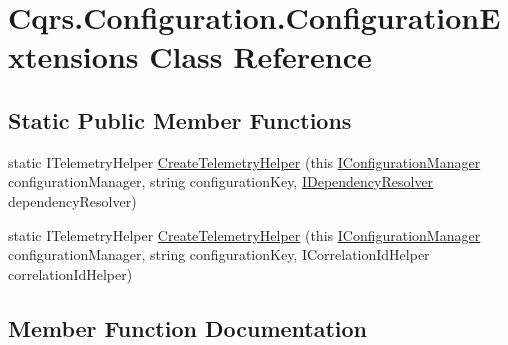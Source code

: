 \hypertarget{classCqrs_1_1Configuration_1_1ConfigurationExtensions}{}\section{Cqrs.\+Configuration.\+Configuration\+Extensions Class Reference}
\label{classCqrs_1_1Configuration_1_1ConfigurationExtensions}
\subsection*{Static Public Member Functions}
\begin{DoxyCompactItemize}
\item 
static I\+Telemetry\+Helper \hyperlink{classCqrs_1_1Configuration_1_1ConfigurationExtensions_aea6ef58f3c312c44a96985c033e7a9ae_aea6ef58f3c312c44a96985c033e7a9ae}{Create\+Telemetry\+Helper} (this \hyperlink{interfaceCqrs_1_1Configuration_1_1IConfigurationManager}{I\+Configuration\+Manager} configuration\+Manager, string configuration\+Key, \hyperlink{interfaceCqrs_1_1Configuration_1_1IDependencyResolver}{I\+Dependency\+Resolver} dependency\+Resolver)
\item 
static I\+Telemetry\+Helper \hyperlink{classCqrs_1_1Configuration_1_1ConfigurationExtensions_a5b4906550efcc42fd0904c23bd7ae685_a5b4906550efcc42fd0904c23bd7ae685}{Create\+Telemetry\+Helper} (this \hyperlink{interfaceCqrs_1_1Configuration_1_1IConfigurationManager}{I\+Configuration\+Manager} configuration\+Manager, string configuration\+Key, I\+Correlation\+Id\+Helper correlation\+Id\+Helper)
\end{DoxyCompactItemize}


\subsection{Member Function Documentation}
\mbox{\label{classCqrs_1_1Configuration_1_1ConfigurationExtensions_aea6ef58f3c312c44a96985c033e7a9ae_aea6ef58f3c312c44a96985c033e7a9ae}} 
